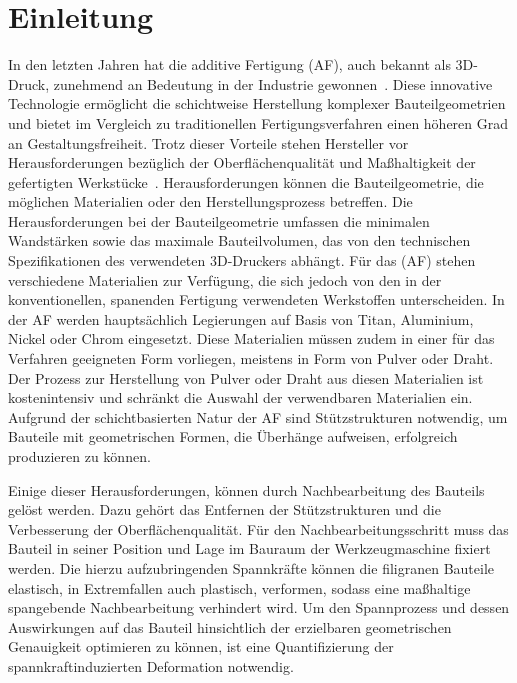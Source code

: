\chapter{Einleitung}

In den letzten Jahren hat die additive Fertigung (AF), auch bekannt als 3D-Druck, 
zunehmend an Bedeutung in der Industrie gewonnen~\cite{JADHAV20222094}. 
Diese innovative Technologie 
ermöglicht die schichtweise Herstellung komplexer Bauteilgeometrien und bietet im 
Vergleich zu traditionellen Fertigungsverfahren einen höheren Grad an 
Gestaltungsfreiheit. Trotz dieser Vorteile stehen Hersteller vor 
Herausforderungen bezüglich der Oberflächenqualität und Maßhaltigkeit 
der gefertigten Werkstücke~\cite{SCHNECK201919}.
Herausforderungen können die Bauteilgeometrie, die möglichen Materialien oder 
den Herstellungsprozess betreffen.
Die Herausforderungen bei der Bauteilgeometrie umfassen die minimalen 
Wandstärken sowie das maximale Bauteilvolumen, das von den technischen 
Spezifikationen des verwendeten 3D-Druckers abhängt. Für das (AF) stehen 
verschiedene Materialien zur Verfügung, 
die sich jedoch von den in der konventionellen, spanenden Fertigung 
verwendeten Werkstoffen unterscheiden. In der AF werden hauptsächlich Legierungen 
auf Basis von Titan, Aluminium, Nickel oder Chrom eingesetzt. Diese Materialien
müssen zudem in einer für das Verfahren geeigneten Form vorliegen, 
meistens in Form von Pulver oder Draht. Der Prozess zur Herstellung von 
Pulver oder Draht aus diesen Materialien ist kostenintensiv und schränkt
die Auswahl der verwendbaren Materialien ein. Aufgrund der 
schichtbasierten Natur der AF sind Stützstrukturen 
notwendig, um Bauteile mit geometrischen Formen, die Überhänge aufweisen, 
erfolgreich produzieren zu können. \label{drawbacks_af}
~\cite{Vranic.2017}

Einige dieser Herausforderungen, können durch Nachbearbeitung des Bauteils 
gelöst werden. Dazu gehört das Entfernen der Stützstrukturen und die Verbesserung
der Oberflächenqualität.
Für den Nachbearbeitungsschritt muss das Bauteil in seiner Position und Lage im Bauraum
der Werkzeugmaschine fixiert werden. Die hierzu aufzubringenden Spannkräfte 
können die filigranen Bauteile elastisch, in Extremfallen auch plastisch, verformen, 
sodass eine maßhaltige spangebende Nachbearbeitung verhindert wird. 
Um den Spannprozess und dessen Auswirkungen auf das Bauteil hinsichtlich 
der erzielbaren geometrischen Genauigkeit optimieren zu
können, ist eine Quantifizierung der spannkraftinduzierten Deformation notwendig.~\cite{newMethod}

